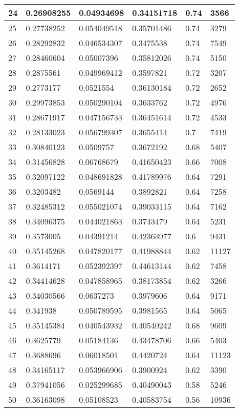 \begin{longtable}{|l|l|l|l|l|l|}
24 & 0.26908255 & 0.04934698 & 0.34151718 & 0.74 & 3566 \\ \hline 
25 & 0.27738252 & 0.054049518 & 0.35701486 & 0.74 & 3279 \\ \hline 
26 & 0.28292832 & 0.046534307 & 0.3475538 & 0.74 & 7549 \\ \hline 
27 & 0.28460604 & 0.05007396 & 0.35812026 & 0.74 & 5150 \\ \hline 
28 & 0.2875561 & 0.049969412 & 0.3597821 & 0.72 & 3207 \\ \hline 
29 & 0.2773177 & 0.0521554 & 0.36130184 & 0.72 & 2652 \\ \hline 
30 & 0.29973853 & 0.050290104 & 0.3633762 & 0.72 & 4976 \\ \hline 
31 & 0.28671917 & 0.047156733 & 0.36451614 & 0.72 & 4533 \\ \hline 
32 & 0.28133023 & 0.056799307 & 0.3655414 & 0.7 & 7419 \\ \hline 
33 & 0.30840123 & 0.0509757 & 0.3672192 & 0.68 & 5407 \\ \hline 
34 & 0.31456828 & 0.06768679 & 0.41650423 & 0.66 & 7008 \\ \hline 
35 & 0.32097122 & 0.048691828 & 0.41789976 & 0.64 & 7291 \\ \hline 
36 & 0.3203482 & 0.0569144 & 0.3892821 & 0.64 & 7258 \\ \hline 
37 & 0.32485312 & 0.055021074 & 0.39033115 & 0.64 & 7162 \\ \hline 
38 & 0.34096375 & 0.044021863 & 0.3743479 & 0.64 & 5231 \\ \hline 
39 & 0.3573005 & 0.04391214 & 0.42363977 & 0.6 & 9431 \\ \hline 
40 & 0.35145268 & 0.047820177 & 0.41988844 & 0.62 & 11127 \\ \hline 
41 & 0.3614171 & 0.052392397 & 0.44613144 & 0.62 & 7458 \\ \hline 
42 & 0.34414628 & 0.047858965 & 0.38173854 & 0.62 & 3266 \\ \hline 
43 & 0.34030566 & 0.0637273 & 0.3979606 & 0.64 & 9171 \\ \hline 
44 & 0.341938 & 0.050789595 & 0.3981565 & 0.64 & 5065 \\ \hline 
45 & 0.35145384 & 0.040543932 & 0.40540242 & 0.68 & 9609 \\ \hline 
46 & 0.3625779 & 0.05184136 & 0.43478706 & 0.66 & 5403 \\ \hline 
47 & 0.3688696 & 0.06018501 & 0.4420724 & 0.64 & 11123 \\ \hline 
48 & 0.34165117 & 0.053966906 & 0.3900924 & 0.62 & 3390 \\ \hline 
49 & 0.37941056 & 0.025299685 & 0.40490043 & 0.58 & 5246 \\ \hline 
50 & 0.36163098 & 0.05108523 & 0.40583754 & 0.56 & 10936 \\ \hline 
\end{longtable}